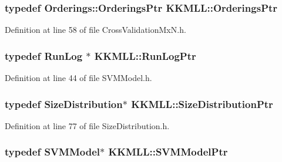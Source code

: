\subsubsection[{\texorpdfstring{Orderings\+Ptr}{OrderingsPtr}}]{\setlength{\rightskip}{0pt plus 5cm}typedef {\bf Orderings\+::\+Orderings\+Ptr} {\bf K\+K\+M\+L\+L\+::\+Orderings\+Ptr}}\hypertarget{namespace_k_k_m_l_l_a5cf1d479819cbad8a8f6777fd4932015}{}\label{namespace_k_k_m_l_l_a5cf1d479819cbad8a8f6777fd4932015}


Definition at line 58 of file Cross\+Validation\+Mx\+N.\+h.

\subsubsection[{\texorpdfstring{Run\+Log\+Ptr}{RunLogPtr}}]{\setlength{\rightskip}{0pt plus 5cm}typedef {\bf Run\+Log} $\ast$ {\bf K\+K\+M\+L\+L\+::\+Run\+Log\+Ptr}}\hypertarget{namespace_k_k_m_l_l_ab6d9a144ab8fc4ae2bedf27a38454c20}{}\label{namespace_k_k_m_l_l_ab6d9a144ab8fc4ae2bedf27a38454c20}


Definition at line 44 of file S\+V\+M\+Model.\+h.

\subsubsection[{\texorpdfstring{Size\+Distribution\+Ptr}{SizeDistributionPtr}}]{\setlength{\rightskip}{0pt plus 5cm}typedef {\bf Size\+Distribution}$\ast$ {\bf K\+K\+M\+L\+L\+::\+Size\+Distribution\+Ptr}}\hypertarget{namespace_k_k_m_l_l_ae8a07a36e941719925a4af7cea91c08b}{}\label{namespace_k_k_m_l_l_ae8a07a36e941719925a4af7cea91c08b}


Definition at line 77 of file Size\+Distribution.\+h.

\subsubsection[{\texorpdfstring{S\+V\+M\+Model\+Ptr}{SVMModelPtr}}]{\setlength{\rightskip}{0pt plus 5cm}typedef {\bf S\+V\+M\+Model}$\ast$ {\bf K\+K\+M\+L\+L\+::\+S\+V\+M\+Model\+Ptr}}\hypertarget{namespace_k_k_m_l_l_ab9364c3a3533933d050a3e9a3490e13a}{}\label{namespace_k_k_m_l_l_ab9364c3a3533933d050a3e9a3490e13a}


